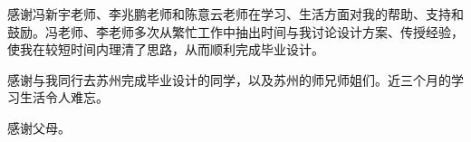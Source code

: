 \begin{thankspage}
感谢冯新宇老师、李兆鹏老师和陈意云老师在学习、生活方面对我的帮助、支持和鼓励。冯老师、李老师多次从繁忙工作中抽出时间与我讨论设计方案、传授经验，使我在较短时间内理清了思路，从而顺利完成毕业设计。

感谢与我同行去苏州完成毕业设计的同学，以及苏州的师兄师姐们。近三个月的学习生活令人难忘。

感谢父母。
\end{thankspage}
